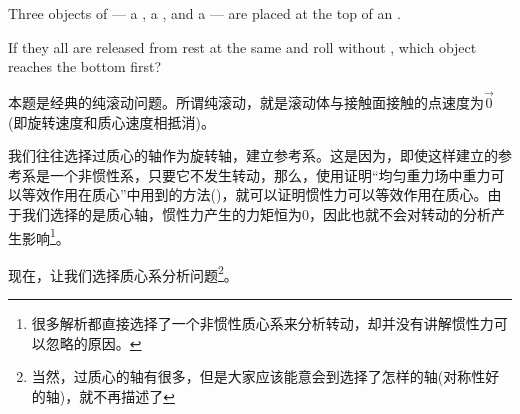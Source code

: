 \begin{solution}
    Three objects of  --- a , a , and a  --- are placed at the top of
    an .
    \begin{center}
    \end{center}
    If they all are released from rest
    at the same  and roll without , which object reaches the bottom first?

    \tcbrule

    本题是经典的纯滚动问题。所谓纯滚动，就是滚动体与接触面接触的点速度为$\vec{0}$(即旋转速度和质心速度相抵消)。

    我们往往选择过质心的轴作为旋转轴，建立参考系。这是因为，即使这样建立的参考系是一个非惯性系，只要它不发生转动，那么，使用证明“均匀重力场中重力可以等效作用在质心”中用到的方法()，就可以证明惯性力可以等效作用在质心。由于我们选择的是质心轴，惯性力产生的力矩恒为$0$，因此也就不会对转动的分析产生影响\footnote{很多解析都直接选择了一个非惯性质心系来分析转动，却并没有讲解惯性力可以忽略的原因。}。

    现在，让我们选择质心系分析问题\footnote{当然，过质心的轴有很多，但是大家应该能意会到选择了怎样的轴(对称性好的轴)，就不再描述了}。


\end{solution}
